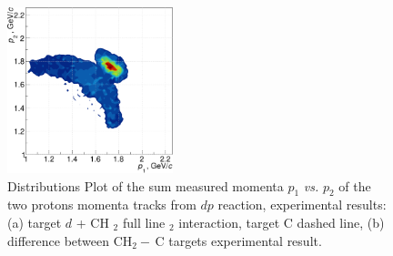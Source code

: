 \documentclass[twocolumn,epjc3]{svjour3}
\providecommand{\DIFaddtex}[1]{{\protect\color{Green} \sf #1}} %
\providecommand{\DIFdeltex}[1]{{\protect\color{Red} \scriptsize #1}} %
\providecommand{\DIFaddend}{} %
\providecommand{\DIFaddFL}[1]{\DIFadd{#1}} %
\providecommand{\DIFdelFL}[1]{\DIFdel{#1}} %
\providecommand{\DIFaddbeginFL}{} %
\providecommand{\DIFaddendFL}{} %
\providecommand{\DIFdelbeginFL}{} %
\providecommand{\DIFdelendFL}{} %
\providecommand{\DIFadd}[1]{\texorpdfstring{\DIFaddtex{#1}}{#1}} %
\providecommand{\DIFdel}[1]{\texorpdfstring{\DIFdeltex{#1}}{}} %
\newcommand{\DIFscaledelfig}{0.5}
\newlength{\DIFdelgraphicswidth} %
\newlength{\DIFdelgraphicsheight} %
\newcommand{\DIFaddincludegraphics}[2][]{{\color{blue}\fbox{\DIFOincludegraphics[#1]{#2}}}} %
\newcommand{\DIFdelincludegraphics}[2][]{%
\sbox{\DIFdelgraphicsbox}{\DIFOincludegraphics[#1]{#2}}%
\settoboxwidth{\DIFdelgraphicswidth}{\DIFdelgraphicsbox} %
\settoboxtotalheight{\DIFdelgraphicsheight}{\DIFdelgraphicsbox} %
\scalebox{\DIFscaledelfig}{%
\parbox[b]{\DIFdelgraphicswidth}{\usebox{\DIFdelgraphicsbox}\\[-\baselineskip] \rule{\DIFdelgraphicswidth}{0em}}\llap{\resizebox{\DIFdelgraphicswidth}{\DIFdelgraphicsheight}{%
\setlength{\unitlength}{\DIFdelgraphicswidth}%
\begin{picture}(1,1)%
\thicklines\linethickness{2pt} %
{\color[rgb]{1,0,0}\put(0,0){\framebox(1,1){}}}%
{\color[rgb]{1,0,0}\put(0,0){\line( 1,1){1}}}%
{\color[rgb]{1,0,0}\put(0,1){\line(1,-1){1}}}%
\end{picture}%
}\hspace*{3pt}}} %
} %
\DeclareRobustCommand{\DIFaddend}{\DIFOaddend \let\includegraphics\DIFOincludegraphics} %
\DeclareRobustCommand{\DIFaddbeginFL}{\DIFOaddbeginFL \let\includegraphics\DIFaddincludegraphics} %
\DeclareRobustCommand{\DIFaddendFL}{\DIFOaddendFL \let\includegraphics\DIFOincludegraphics} %
\DeclareRobustCommand{\DIFdelbeginFL}{\DIFOdelbeginFL \let\includegraphics\DIFdelincludegraphics} %
\DeclareRobustCommand{\DIFdelendFL}{\DIFOaddendFL \let\includegraphics\DIFOincludegraphics} %
\begin{document}
\DIFaddend \begin{figure}[h]
  \centering
  \DIFdelbeginFL %
\DIFdelendFL \DIFaddbeginFL \includegraphics[width=0.43\textwidth]{p1_vs_p2_2.pdf}
  \DIFaddendFL \caption{\DIFdelbeginFL \DIFdelFL{Distributions }\DIFdelendFL \DIFaddbeginFL \DIFaddFL{Plot }\DIFaddendFL of the \DIFdelbeginFL \DIFdelFL{sum }\DIFdelendFL \DIFaddbeginFL \DIFaddFL{measured momenta $p_1$ \textit{vs.} $p_2$ }\DIFaddendFL of the two
    \DIFdelbeginFL \DIFdelFL{protons momenta }\DIFdelendFL \DIFaddbeginFL \DIFaddFL{tracks }\DIFaddendFL from \DIFdelbeginFL \DIFdelFL{$dp$
    reaction, experimental results: (a) target }\DIFdelendFL \DIFaddbeginFL \DIFaddFL{$d$ + }\DIFaddendFL CH\DIFdelbeginFL \DIFdelFL{$_2$ full line}\DIFdelendFL \DIFaddbeginFL \DIFaddFL{$_{2}$ interaction}\DIFaddendFL , \DIFdelbeginFL \DIFdelFL{target C dashed
    line, (b) difference between CH$_2-$\,C targets}\DIFdelendFL \DIFaddbeginFL \DIFaddFL{experimental result}\DIFaddendFL .}
  \DIFdelbeginFL %
\DIFdelendFL \DIFaddbeginFL \label{fig:p1vsp2_exp}
\DIFaddendFL \end{figure}
\end{document}
